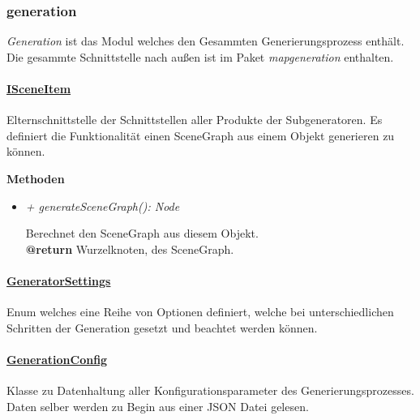 \subsubsection{generation}
    \textit{Generation} ist das Modul welches den Gesammten
    Generierungsprozess enthält. Die gesammte Schnittstelle nach außen
    ist im Paket \textit{mapgeneration} enthalten.\par



    \paragraph{\underline{ISceneItem}} \mbox{}\par
        Elternschnittstelle der Schnittstellen aller Produkte der Subgeneratoren.
        Es definiert die Funktionalität einen SceneGraph aus einem Objekt generieren zu können.\par
            
        \textbf{Methoden}	
        \begin{itemize}
            \item  \textit{+ generateSceneGraph(): Node}
                \begin{leftbar}[0.9\linewidth]
                    Berechnet den SceneGraph aus diesem Objekt.\\
                    \textbf{@return} Wurzelknoten, des SceneGraph.
                \end{leftbar}   
        \end{itemize}


    \paragraph{\underline{GeneratorSettings}} \mbox{}\par
        Enum welches eine Reihe von Optionen definiert, welche bei unterschiedlichen
        Schritten der Generation gesetzt und beachtet werden können.\par

    \paragraph{\underline{GenerationConfig}} \mbox{}\par
        Klasse zu Datenhaltung aller Konfigurationsparameter des Generierungsprozesses.
        Daten selber werden zu Begin aus einer JSON Datei gelesen.\par
    


